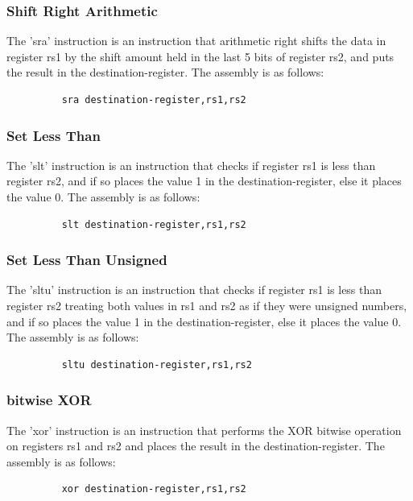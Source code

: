 \subsubsection{Shift Right Arithmetic}
\qquad
The 'sra' instruction is an instruction that arithmetic right shifts the data in register rs1 by the shift amount held in the last 5 bits of register rs2, and puts the result in the destination-register. The assembly is as follows:
\begin{figure}[!htbp]
    \centering
    \begin{verbatim}
    sra destination-register,rs1,rs2
    \end{verbatim}
\end{figure}\newline

\subsubsection{Set Less Than}
\qquad
The 'slt' instruction is an instruction that checks if register rs1 is less than register rs2, and if so places the value 1 in the destination-register, else it places the value 0. The assembly is as follows:
\begin{figure}[!htbp]
    \centering
    \begin{verbatim}
    slt destination-register,rs1,rs2
    \end{verbatim}
\end{figure}\newline

\subsubsection{Set Less Than Unsigned}
\qquad
The 'sltu' instruction is an instruction that checks if register rs1 is less than register rs2 treating both values in rs1 and rs2 as if they were unsigned numbers, and if so places the value 1 in the destination-register, else it places the value 0. The assembly is as follows:
\begin{figure}[!htbp]
    \centering
    \begin{verbatim}
    sltu destination-register,rs1,rs2
    \end{verbatim}
\end{figure}\newline

\subsubsection{bitwise XOR}
\qquad
The 'xor' instruction is an instruction that performs the XOR bitwise operation on registers rs1 and rs2 and places the result in the destination-register. The assembly is as follows:
\begin{figure}[!htbp]
    \centering
    \begin{verbatim}
    xor destination-register,rs1,rs2
    \end{verbatim}
\end{figure}\newline


